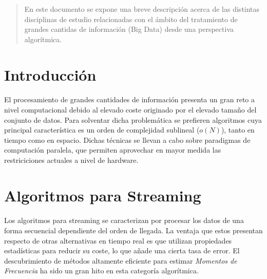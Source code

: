 \documentclass{article}
\begin{document}
  \maketitle %



  	\begin{abstract}
  		\noindent En este documento se expone una breve descripción acerca de las distintas disciplinas de estudio relacionadas con el ámbito del tratamiento de grandes cantidas de información (Big Data) desde una perspectiva algorítmica.
  	\end{abstract}


  \section{Introducción}

    \paragraph{}
    El procesamiento de grandes cantidades de información presenta un gran reto a nivel computacional debido al elevado coste originado por el elevado tamaño del conjunto de datos. Para solventar dicha problemática se prefieren algoritmos cuya principal característica es un orden de complejidad sublineal ($o(N)$), tanto en tiempo como en espacio. Dichas técnicas se llevan a cabo sobre paradigmas de computación paralela, que permiten aprovechar en mayor medida las restriciciones actuales a nivel de hardware.

  \section{Algoritmos para Streaming}

    \paragraph{}
    Los algoritmos para streaming se caracterizan por procesar los datos de una forma secuencial dependiente del orden de llegada. La ventaja que estos presentan respecto de otras alternativas en tiempo real es que utilizan propiedades estadísticas para reducir su coste, lo que añade una cierta tasa de error. El descubrimiento de métodos altamente eficiente para estimar \emph{Momentos de Frecuencia} ha sido un gran hito en esta categoría algorítmica.
\end{document}
